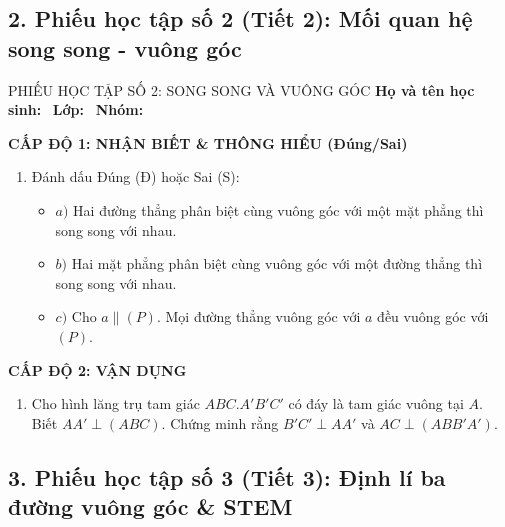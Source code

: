 \documentclass[12pt, a4paper]{article}
\begin{document}
\subsection*{2. Phiếu học tập số 2 (Tiết 2): Mối quan hệ song song - vuông góc}

\begin{pedabox}{PHIẾU HỌC TẬP SỐ 2: SONG SONG VÀ VUÔNG GÓC}
\textbf{Họ và tên học sinh:} \dotfill \ \textbf{Lớp:} \dotfill \ \textbf{Nhóm:} \dotfill

\noindent \textbf{CẤP ĐỘ 1: NHẬN BIẾT \& THÔNG HIỂU (Đúng/Sai)}
\begin{enumerate}[leftmargin=0.6cm]
    \item Đánh dấu Đúng (Đ) hoặc Sai (S):
    \begin{itemize}
        \item [$\Box$] $a)$ Hai đường thẳng phân biệt cùng vuông góc với một mặt phẳng thì song song với nhau.
        \item [$\Box$] $b)$ Hai mặt phẳng phân biệt cùng vuông góc với một đường thẳng thì song song với nhau.
        \item [$\Box$] $c)$ Cho $a \parallel (P)$. Mọi đường thẳng vuông góc với $a$ đều vuông góc với $(P)$.
    \end{itemize}
\end{enumerate}

\noindent \textbf{CẤP ĐỘ 2: VẬN DỤNG}
\begin{enumerate}[leftmargin=0.6cm]
    \item Cho hình lăng trụ tam giác $ABC.A'B'C'$ có đáy là tam giác vuông tại $A$. Biết $AA' \perp (ABC)$. Chứng minh rằng $B'C' \perp AA'$ và $AC \perp (ABB'A')$.
\end{enumerate}
\end{pedabox}

\subsection*{3. Phiếu học tập số 3 (Tiết 3): Định lí ba đường vuông góc & STEM}
\end{document}
